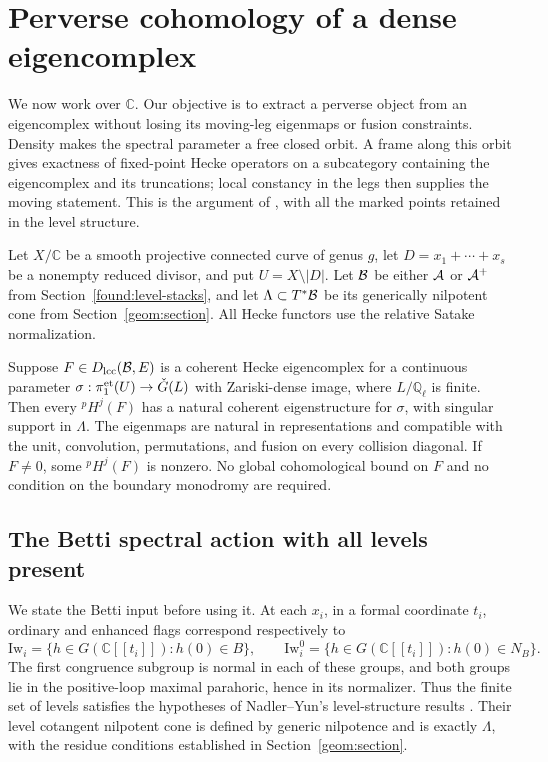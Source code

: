 \section{Perverse cohomology of a dense eigencomplex}
\label{perv:section}

We now work over $\mathbb C$.  Our objective is to extract a perverse
object from an eigencomplex without losing its moving-leg eigenmaps or
fusion constraints.  Density makes the spectral parameter a free closed
orbit.  A frame along this orbit gives exactness of fixed-point Hecke
operators on a subcategory containing the eigencomplex and its
truncations; local constancy in the legs then supplies the moving
statement.  This is the argument of \cite[\S6]{CT}, with all the marked
points retained in the level structure.

Let $X/\mathbb C$ be a smooth projective connected curve of genus $g$,
let $D=x_1+\cdots+x_s$ be a nonempty reduced divisor, and put
$U=X\setminus |D|$.  Let $\mathcal B$ be either $\mathcal A$ or $\mathcal A^+$ from
Section~\ref{found:level-stacks}, and let $\Lambda\subset T^*\mathcal B$
be its generically nilpotent cone from Section~\ref{geom:section}.
All Hecke functors use the relative Satake normalization.

\begin{proposition}\label{perv:eigen}
Suppose $F\in D_{\mathrm{lcc}}(\mathcal B,E)$ is a coherent Hecke eigencomplex for a
continuous parameter
$\sigma:\pi_1^{\mathrm{et}}(U)\to\check G(L)$ with Zariski-dense image, where
$L/\mathbb Q_\ell$ is finite.  Then every ${}^pH^j(F)$ has a natural
coherent eigenstructure for $\sigma$, with singular support in $\Lambda$.
The eigenmaps are natural in representations and compatible with the
unit, convolution, permutations, and fusion on every collision diagonal.
If $F\ne0$, some ${}^pH^j(F)$ is nonzero.  No global cohomological bound
on $F$ and no condition on the boundary monodromy are required.
\end{proposition}

\subsection{The Betti spectral action with all levels present}

We state the Betti input before using it.  At each $x_i$, in a formal
coordinate $t_i$, ordinary and enhanced flags correspond respectively to
\[
 \mathrm{Iw}_i=\{h\in G(\mathbb C[[t_i]]):h(0)\in B\},\qquad
 \mathrm{Iw}_i^0=\{h\in G(\mathbb C[[t_i]]):h(0)\in N_B\}.
\]
The first congruence subgroup is normal in each of these groups, and
both groups lie in the positive-loop maximal parahoric, hence in its
normalizer.  Thus the finite set of levels satisfies the
hypotheses of Nadler--Yun's level-structure results
\cite[\S6.2]{NY}.  Their level cotangent nilpotent cone is defined by
generic nilpotence and is exactly $\Lambda$, with the residue conditions
established in Section~\ref{geom:section}.

